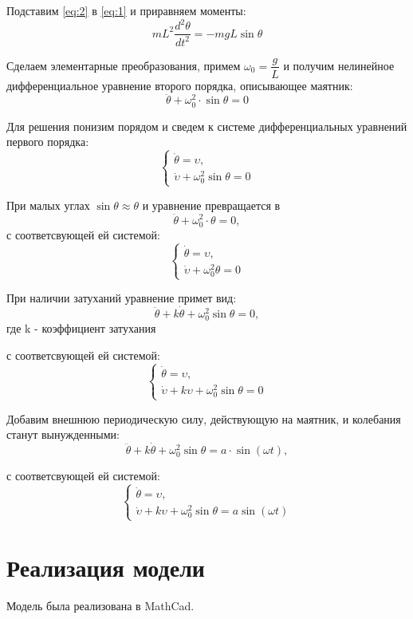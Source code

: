 \documentclass[a4paper, 14pt]{extarticle}
\begin{document}
		Подставим \eqref{eq:2} в \eqref{eq:1} и приравняем моменты:
		\[ mL^2\dfrac{d^2\theta}{dt^2} = -mgL\sin{\theta} \] 
		
		Сделаем элементарные преобразования, примем $\omega_0 = \dfrac{g}{L}$ и получим нелинейное дифференциальное уравнение второго порядка, описывающее маятник:
		\[ \ddot{\theta} + \omega_0^2 \cdot \sin{\theta} = 0 \]
		
		Для решения понизим порядом и сведем к системе дифференциальных уравнений первого порядка:
		\[\begin{cases}
			\dot{\theta} = \upsilon, \\
			\dot{\upsilon} + \omega_0^2\sin{\theta} = 0
		\end{cases}\]
		
		При малых углах \( \sin{\theta} \approx \theta \) и уравнение превращается в
		\[ \ddot{\theta} + \omega_0^2 \cdot \theta = 0, \]
		с соответсвующей ей системой:
		\[\begin{cases}
			\dot{\theta} = \upsilon, \\
			\dot{\upsilon} + \omega_0^2\theta = 0
		\end{cases}\]
		
		При наличии затуханий уравнение примет вид:
		\[ \ddot{\theta} + k \dot{\theta} + \omega_0^2\sin{\theta} = 0, \]
		где k - коэффициент затухания
		
		с соответсвующей ей системой:
		\[\begin{cases}
			\dot{\theta} = \upsilon, \\
			\dot{\upsilon} + k\upsilon +\omega_0^2\sin{\theta} = 0
		\end{cases}\]
		
		Добавим внешнюю периодическую силу, действующую на маятник, и колебания станут вынужденными:
		\[ \ddot{\theta} + k \dot{\theta} + \omega_0^2\sin{\theta} = a \cdot \sin{(\omega t)}, \]
		
		с соответсвующей ей системой:
		\[\begin{cases}
			\dot{\theta} = \upsilon, \\
			\dot{\upsilon} + k\upsilon +\omega_0^2\sin{\theta} = a\sin{(\omega t)}
		\end{cases}\]
	
	\pagebreak
	\section{Реализация модели}
		Модель была реализована в MathCad.
\end{document}

